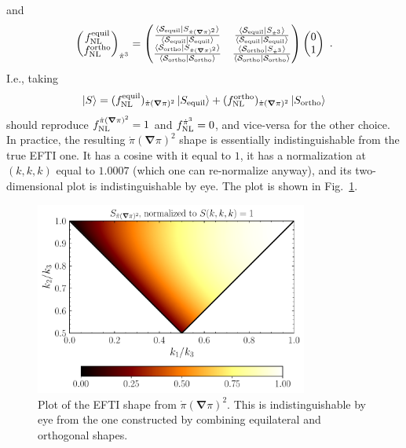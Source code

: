 \documentclass[aps,prd,amsmath,floats,floatfix,superscriptaddress,nofootinbib%
]{revtex4}%
\renewcommand\({\left(}
\renewcommand\){\right)}
\renewcommand\[{\left[}
\renewcommand\]{\right]}
\renewcommand{\vec}{\bm}
\begin{document}
and 
\begin{equation}
\begin{pmatrix}
f_{\rm NL}^{\rm equil} \\
f_{\rm NL}^{\rm ortho}
\end{pmatrix}_{\dot{\pi}^3}
 = \begin{pmatrix}
\frac{\braket{{\cal S}_{\rm equil}|S_{\dot{\pi}(\vec{\nabla}\pi)^2}}}{\braket{{\cal S}_{\rm equil}|{\cal S}_{\rm equil}}} & \frac{\braket{{\cal S}_{\rm equil}|S_{\dot{\pi}^3}}}{\braket{{\cal S}_{\rm equil}|{\cal S}_{\rm equil}}} \\
\frac{\braket{{\cal S}_{\rm ortho}|S_{\dot{\pi}(\vec{\nabla}\pi)^2}}}{\braket{{\cal S}_{\rm ortho}|{\cal S}_{\rm ortho}}} & \frac{\braket{{\cal S}_{\rm ortho}|S_{\dot{\pi}^3}}}{\braket{{\cal S}_{\rm ortho}|{\cal S}_{\rm ortho}}}
\end{pmatrix}
\begin{pmatrix}
0 \\
1
\end{pmatrix}\,\,.
\end{equation} 
I.e., taking 
\begin{equation}
\ket{S} = (f_{\rm NL}^{\rm equil})_{\dot{\pi}(\vec{\nabla}\pi)^2}\ket{S_{\rm equil}} + (f_{\rm NL}^{\rm ortho})_{\dot{\pi}(\vec{\nabla}\pi)^2}\ket{S_{\rm ortho}} %
\end{equation} 
should reproduce $f_{\rm NL}^{\dot{\pi}(\vec{\nabla}\pi)^2} = 1$ and $f_{\rm NL}^{\dot{\pi}^3}=0$, and vice-versa for the other choice. 
In practice, the resulting ${\dot{\pi}(\vec{\nabla}\pi)^2}$ shape is essentially indistinguishable from the true EFTI one. 
It has a cosine with it equal to $1$, it has a normalization at $(k,k,k)$ equal to $1.0007$ (which one can re-normalize anyway), and its two-dimensional plot is indistinguishable by eye. The plot is shown in Fig.~\ref{fig:dotpinablapisquared}. 
\begin{figure}[h!]
\centering
\includegraphics[width=0.8\textwidth]{plot_dotpinablapisquared.pdf}
\caption{Plot of the EFTI shape from $\dot{\pi}(\vec{\nabla}\pi)^2$. This is indistinguishable by eye from the one constructed by combining equilateral and orthogonal shapes.} 
\label{fig:dotpinablapisquared}
\end{figure} 
\end{document}
